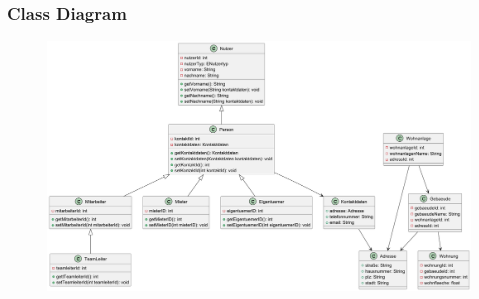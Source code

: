 \begin{frame}
\frametitle{Class Diagram}

\begin{figure}
  \includegraphics[height=0.9\textheight]{figures/model_Gesamt.png}
  \label{fig:class}
\end{figure}

\end{frame}




